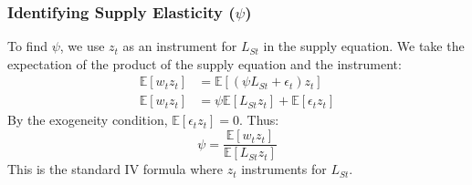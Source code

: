 \documentclass[aspectratio=169,11pt]{beamer}
\begin{document}
\begin{frame}[shrink,label=app_psi_identification]
    \frametitle{Identifying Supply Elasticity ($\psi$)}
    To find $\psi$, we use $z_t$ as an instrument for $L_{St}$ in the supply equation. We take the expectation of the product of the supply equation and the instrument:
    \begin{align*}
        \mathbb{E}[w_t z_t] & = \mathbb{E}[(\psi L_{St} + \epsilon_t) z_t]               \\
        \mathbb{E}[w_t z_t] & = \psi \mathbb{E}[L_{St} z_t] + \mathbb{E}[\epsilon_t z_t]
    \end{align*}
    By the exogeneity condition, $\mathbb{E}[\epsilon_t z_t] = 0$. Thus:
    \begin{equation}
        \psi = \frac{\mathbb{E}[w_t z_t]}{\mathbb{E}[L_{St} z_t]}
    \end{equation}
    This is the standard IV formula where $z_t$ instruments for $L_{St}$.
    \vspace{0.1cm}
    \hfill \hyperlink{src_psi_identification}{}
\end{frame}
\end{document}
